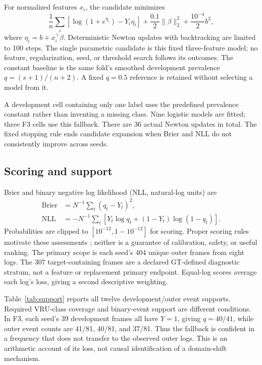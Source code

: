 \documentclass[conference]{IEEEtran}
\begin{document}
For normalized features $x_i$, the candidate minimizes
\begin{equation}
\frac{1}{n}\sum_i\!\left[\log(1+e^{\eta_i})-Y_i\eta_i\right]
+\frac{0.1}{2}\|\beta\|_2^2+\frac{10^{-4}}{2}b^2,
\end{equation}
where $\eta_i=b+x_i^\top\beta$. Deterministic Newton updates with backtracking are limited to 100 steps. The single parametric candidate is this fixed three-feature model; no feature, regularization, seed, or threshold search follows its outcomes. The constant baseline is the same fold's smoothed development prevalence $q=(s+1)/(n+2)$. A fixed $q=0.5$ reference is retained without selecting a model from it.

A development cell containing only one label uses the predefined prevalence constant rather than inventing a missing class. Nine logistic models are fitted; three F3 cells use this fallback. There are 36 actual Newton updates in total. The fixed stopping rule ends candidate expansion when Brier and NLL do not consistently improve across seeds.

\subsection{Scoring and support}
Brier and binary negative log likelihood (NLL, natural-log units) are
\begin{align}
\mathrm{Brier}&=N^{-1}\sum_t(q_t-Y_t)^2,\\
\mathrm{NLL}&=-N^{-1}\sum_t[Y_t\log q_t+(1-Y_t)\log(1-q_t)].
\end{align}
Probabilities are clipped to $[10^{-12},1-10^{-12}]$ for scoring. Proper scoring rules motivate these assessments \cite{Gneiting2007Scoring}; neither is a guarantee of calibration, safety, or useful ranking. The primary scope is each seed's 404 unique outer frames from eight logs. The 307 target-containing frames are a declared GT-defined diagnostic stratum, not a feature or replacement primary endpoint. Equal-log scores average each log's loss, giving a second descriptive weighting.

Table~\ref{tab:support} reports all twelve development/outer event supports. Required VRU-class coverage and binary-event support are different conditions. In F3, each seed's 39 development frames all have $Y=1$, giving $q=40/41$, while outer event counts are 41/81, 40/81, and 37/81. Thus the fallback is confident in a frequency that does not transfer to the observed outer logs. This is an arithmetic account of its loss, not causal identification of a domain-shift mechanism.

\end{document}
